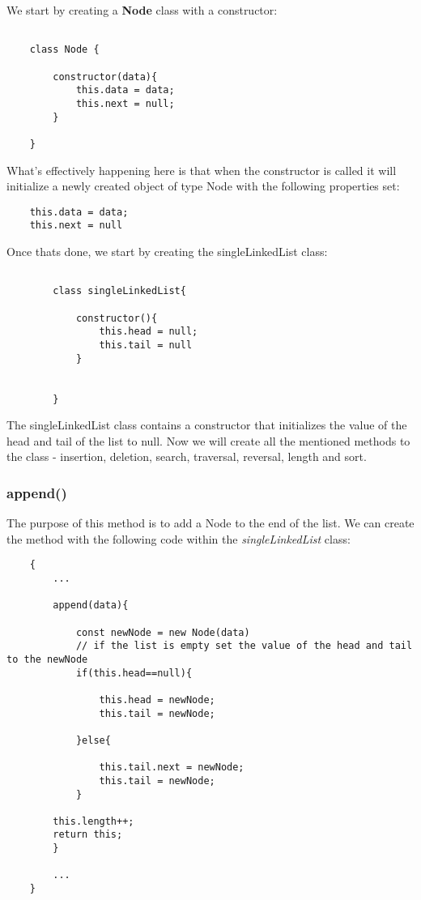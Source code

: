 \documentclass{article}
\begin{document}
We start by creating a \textbf{Node} class with a constructor:

\begin{verbatim}
    
    class Node {

        constructor(data){
            this.data = data;
            this.next = null;
        }

    }

\end{verbatim}
What's effectively happening here is that when the constructor is called it will initialize a newly created object of type Node with the following properties set: 
\begin{verbatim}
    this.data = data;
    this.next = null
\end{verbatim}


Once thats done, we start by creating the singleLinkedList class:

\begin{verbatim}
    
        class singleLinkedList{

            constructor(){
                this.head = null;
                this.tail = null
            }


        }
\end{verbatim}

The singleLinkedList class contains a constructor that initializes the value of the head and tail of the list to null. Now we will create all the mentioned methods to the class - insertion, deletion, search, traversal, reversal, length and sort.
\newpage
\subsubsection{append()}

The purpose of this method is to add a Node to the end of the list. We can create the method with the following code within the \textit{singleLinkedList} class:

\begin{verbatim}
    {
        ...

        append(data){

            const newNode = new Node(data)
            // if the list is empty set the value of the head and tail to the newNode
            if(this.head==null){

                this.head = newNode;
                this.tail = newNode;

            }else{

                this.tail.next = newNode;
                this.tail = newNode;
            }

        this.length++;
        return this;
        }

        ...
    }
\end{verbatim}
\end{document}
